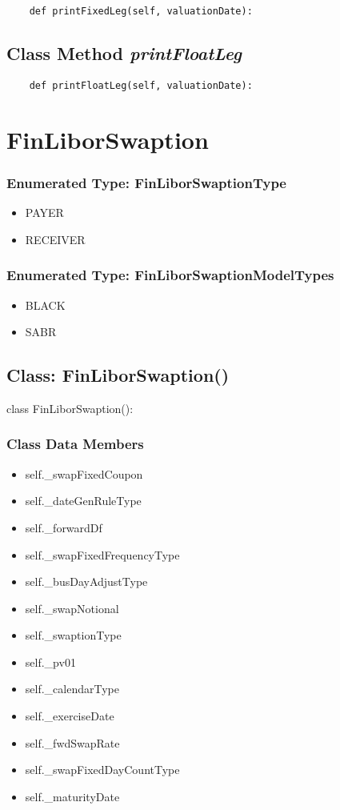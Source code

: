 \documentclass[twoside,11pt]{book}
\begin{document}
\begin{lstlisting}
    def printFixedLeg(self, valuationDate):
\end{lstlisting}

\subsection{Class Method {\it printFloatLeg}}


\begin{lstlisting}
    def printFloatLeg(self, valuationDate):
\end{lstlisting}

\newpage
\section{FinLiborSwaption}

\subsubsection{Enumerated Type: FinLiborSwaptionType}
\begin{itemize}
\item{PAYER}
\item{RECEIVER}
\end{itemize}

\subsubsection{Enumerated Type: FinLiborSwaptionModelTypes}
\begin{itemize}
\item{BLACK}
\item{SABR}
\end{itemize}

\subsection{Class: FinLiborSwaption()}
class FinLiborSwaption():

\subsubsection{Class Data Members}
\begin{itemize}
\item{self.\_swapFixedCoupon}
\item{self.\_dateGenRuleType}
\item{self.\_forwardDf}
\item{self.\_swapFixedFrequencyType}
\item{self.\_busDayAdjustType}
\item{self.\_swapNotional}
\item{self.\_swaptionType}
\item{self.\_pv01}
\item{self.\_calendarType}
\item{self.\_exerciseDate}
\item{self.\_fwdSwapRate}
\item{self.\_swapFixedDayCountType}
\item{self.\_maturityDate}
\end{itemize}
\end{document}
